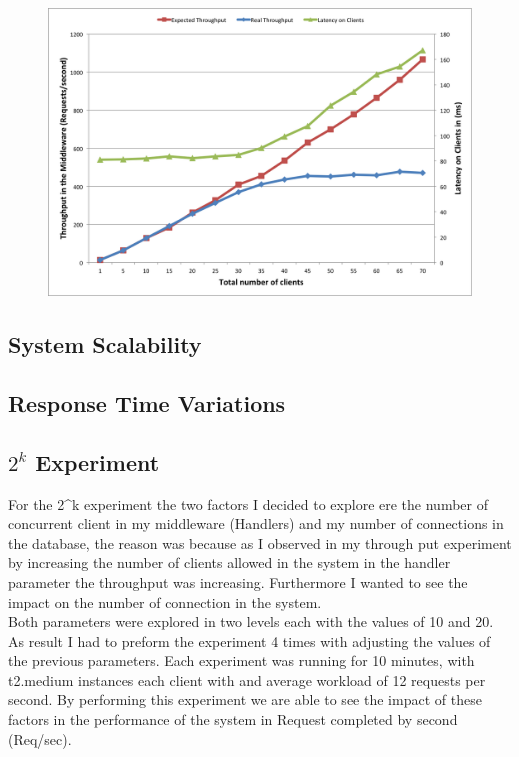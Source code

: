 \begin{figure}[h!]
	\centering
	\includegraphics[scale=0.4]{through.png}
	\caption{}
	\label{through}
\end{figure}

\subsection{System Scalability}\label{sec:system-scalability}



\subsection{Response Time Variations}\label{sec:response-time-variations}



\subsection{$2^k$ Experiment}\label{sec:k-experiment}
For the 2\^{}k experiment the two factors I decided to explore ere the number of concurrent client in my middleware (Handlers) and my number of connections in the database, the reason was because as I observed in my through put experiment by increasing the number of clients allowed in the system in the handler parameter the throughput was increasing. Furthermore I wanted to see the impact on the number of connection in the system.\\

Both parameters were explored in two levels each with the values of 10 and 20. As result I had to preform the experiment 4 times with adjusting the values of the previous parameters. Each experiment was running for 10 minutes, with t2.medium instances each client with and average workload of 12 requests per second.
By performing this experiment we are able to see the impact of these factors in the performance of the system in Request completed by second (Req/sec).

